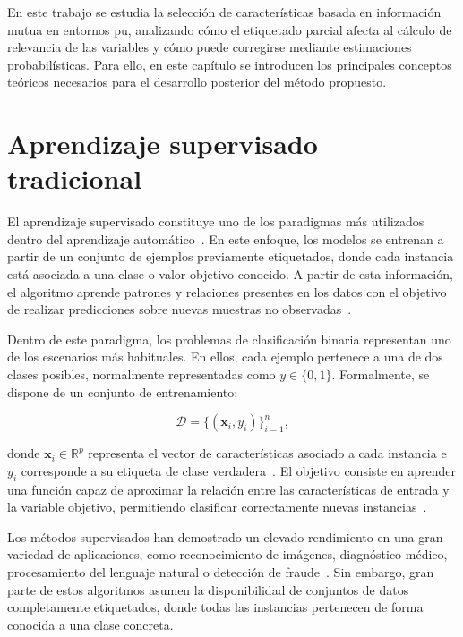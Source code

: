 En este trabajo se estudia la selección de características basada en información mutua en entornos \acrshort{pu}, analizando cómo el etiquetado parcial afecta al cálculo de relevancia de las variables y cómo puede corregirse mediante estimaciones probabilísticas. Para ello, en este capítulo se introducen los principales conceptos teóricos necesarios para el desarrollo posterior del método propuesto.

\section{Aprendizaje supervisado tradicional}
\label{sec:supervisado}

El aprendizaje supervisado constituye uno de los paradigmas más utilizados dentro del aprendizaje automático~\cite{bishop2006pattern, hastie2009elements}. En este enfoque, los modelos se entrenan a partir de un conjunto de ejemplos previamente etiquetados, donde cada instancia está asociada a una clase o valor objetivo conocido. A partir de esta información, el algoritmo aprende patrones y relaciones presentes en los datos con el objetivo de realizar predicciones sobre nuevas muestras no observadas~\cite{vapnik1995nature}.

Dentro de este paradigma, los problemas de clasificación binaria representan uno de los escenarios más habituales. En ellos, cada ejemplo pertenece a una de dos clases posibles, normalmente representadas como $y \in \{0,1\}$. Formalmente, se dispone de un conjunto de entrenamiento:

\[
\mathcal{D} = \{(\mathbf{x}_i, y_i)\}_{i=1}^{n},
\]

donde $\mathbf{x}_i \in \mathbb{R}^p$ representa el vector de características asociado a cada instancia e $y_i$ corresponde a su etiqueta de clase verdadera~\cite{bishop2006pattern}. El objetivo consiste en aprender una función capaz de aproximar la relación entre las características de entrada y la variable objetivo, permitiendo clasificar correctamente nuevas instancias~\cite{murphy2012machine}.

Los métodos supervisados han demostrado un elevado rendimiento en una gran variedad de aplicaciones, como reconocimiento de imágenes, diagnóstico médico, procesamiento del lenguaje natural o detección de fraude~\cite{goodfellow2016deep}. Sin embargo, gran parte de estos algoritmos asumen la disponibilidad de conjuntos de datos completamente etiquetados, donde todas las instancias pertenecen de forma conocida a una clase concreta.

